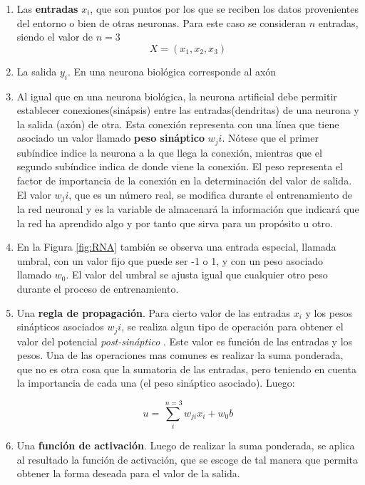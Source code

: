\documentclass[12pt]{article}
\begin{document}
\begin{enumerate}
  \item Las \textbf{entradas} $x_i$, que son puntos por los que se reciben los datos provenientes del entorno o bien de otras neuronas. Para este caso se consideran $n$ entradas, siendo el valor de $n=3$
  \[ X = (x_1,x_2,x_3)\]
  
  \item La salida $y_i$. En una neurona biológica corresponde al axón
  \item Al igual que en una neurona biológica, la neurona artificial debe permitir establecer conexiones(sinápsis) entre las entradas(dendritas) de una neurona y la salida (axón) de otra. Esta conexión representa con una línea que tiene asociado un valor llamado \textbf{peso sináptico} $w_ji$. Nótese que el primer subíndice indice la neurona a la que llega la conexión, mientras que el segundo subíndice indica de donde viene la conexión. El peso representa el factor de importancia de la conexión en la determinación del valor de salida. El valor $w_ji$, que es un número real, se modifica durante el entrenamiento de la red neuronal y es la variable de almacenará la información que indicará que la red ha aprendido algo y por tanto que sirva para un propósito u otro.
  
  \item En la Figura \ref{fig:RNA} también se observa una entrada especial, llamada umbral, con un valor fijo que puede ser -1 o 1, y con un peso asociado llamado $w_0$. El valor del umbral se ajusta igual que cualquier otro peso durante el proceso de entrenamiento.
  
  \item Una \textbf{regla de propagación}. Para cierto valor de las entradas $x_i$ y los pesos sinápticos asociados $w_ji$, se realiza algun tipo de operación para obtener el valor del potencial \textit{post-sináptico} . Este valor es función de las entradas y los pesos. Una de las operaciones mas comunes es realizar la suma ponderada, que no es otra cosa que la sumatoria de las entradas, pero teniendo en cuenta la importancia de cada una (el peso sináptico asociado). Luego:


\[u=\sum_{i}^{\ n=3} w_{ji}x_i + w_0b\]


\item Una \textbf{función de activación}. Luego de realizar la suma ponderada, se aplica al resultado la función de activación, que se escoge de tal manera que permita obtener la forma deseada para el valor de la salida.


\end{enumerate}
\end{document}
